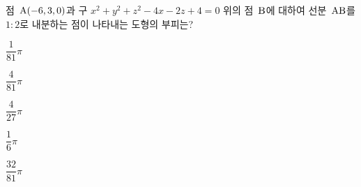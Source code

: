 점~$\mathrm{A}(-6{,}\mkern3mu\mathopen{}3{,}\mkern3mu\mathopen{}0)$과 구 $x^2+y^2+z^2-4x-2z+4=0$ 위의 점~$\mathrm{B}$에 대하여 선분~$\mathrm{AB}$를 $1:2$로 내분하는 점이 나타내는 도형의 부피는?
\begin{choices32}{\rule[-3ex]{0pt}{8ex}$\dfrac{1}{81}\pi$}{\rule[-3ex]{0pt}{8ex}$\dfrac{4}{81}\pi$}{\rule[-3ex]{0pt}{8ex}$\dfrac{4}{27}\pi$}{\rule[-3ex]{0pt}{8ex}$\dfrac{1}{6}\pi$}{\rule[-3ex]{0pt}{8ex}$\dfrac{32}{81}\pi$}\end{choices32}
